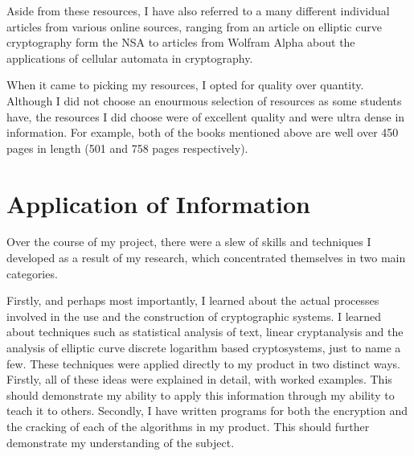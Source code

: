 \documentclass[12pt, a4paper, draft]{report}
\begin{document}
Aside from these resources, I have also referred to a many different
individual articles from various online sources, ranging from an article on
elliptic curve cryptography form the NSA to articles from Wolfram Alpha
about the applications of cellular automata in cryptography.


When it came to picking my resources, I opted for quality over quantity.
Although I did not choose an enourmous selection of resources as some
students have, the resources I did choose were of excellent quality
and were ultra dense in information. For example, both of the books
mentioned above are well over 450 pages in length (501 and 758
pages respectively).

\section{Application of Information}

Over the course of my project, there were a slew of skills and techniques
I developed as a result of my research, which concentrated themselves in
two main categories.

Firstly, and perhaps most importantly, I learned about the actual processes
involved in the use and the construction of cryptographic systems. I
learned about techniques such as statistical analysis of text, linear
cryptanalysis and the analysis of elliptic curve discrete logarithm based
cryptosystems, just to name a few. These techniques were applied directly
to my product in two distinct ways. Firstly, all of these ideas were explained in detail, with worked examples.
This should demonstrate my ability to apply this information through my
ability to teach it to others. Secondly, I have written programs for
both the encryption and the cracking of each of the algorithms in my
product. This should further demonstrate my understanding of the subject.
\end{document}
